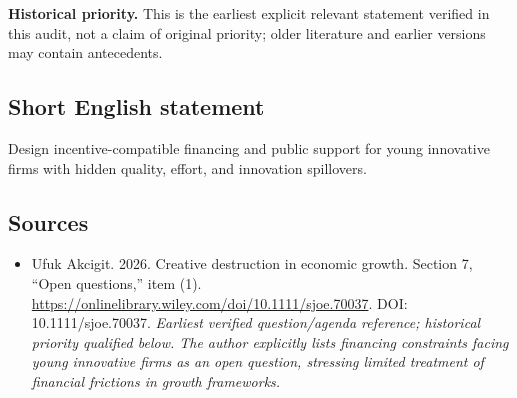 \documentclass[11pt]{article}
\begin{document}
\par\textbf{Historical priority.} This is the earliest explicit relevant statement verified in this audit, not a claim of original priority; older literature and earlier versions may contain antecedents.

\subsection{Short English statement}
Design incentive-compatible financing and public support for young innovative firms with hidden quality, effort, and innovation spillovers.

\subsection{Sources}
\begin{itemize}\raggedright
\item[\textnormal{[S1]}]\hypertarget{source:30007548:1}{} Ufuk Akcigit. 2026. Creative destruction in economic growth. Section 7, “Open questions,” item (1).
\url{https://onlinelibrary.wiley.com/doi/10.1111/sjoe.70037}.
DOI: 10.1111/sjoe.70037.
{\small\textit{Earliest verified question/agenda reference; historical priority qualified below. The author explicitly lists financing constraints facing young innovative firms as an open question, stressing limited treatment of financial frictions in growth frameworks.}}
\end{itemize}
\end{document}
